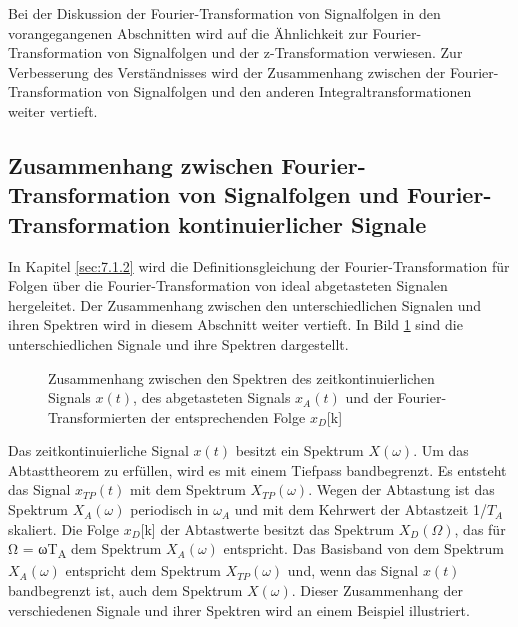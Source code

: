 Bei der Diskussion der Fourier-Transformation von Signalfolgen in den vorangegangenen Abschnitten wird auf die Ähnlichkeit zur Fourier-Transformation von Signalfolgen und der z-Transformation verwiesen. Zur Verbesserung des Verständnisses wird der Zusammenhang zwischen der Fourier-Transformation von Signalfolgen und den anderen Integraltransformationen weiter vertieft.

\subsection{Zusammenhang zwischen Fourier-Transformation von Signalfolgen und Fourier-Transformation kontinuierlicher Signale}\label{sec:zusammenhang-zwischen-fourier-transformation-von-signalfolgen-und-fourier-transformation-kontinuierlicher-signale}

In Kapitel \ref{sec:7.1.2} wird die Definitionsgleichung der Fourier-Transformation für Folgen über die Fourier-Transformation von ideal abgetasteten Signalen hergeleitet. Der Zusammenhang zwischen den unterschiedlichen Signalen und ihren Spektren wird in diesem Abschnitt weiter vertieft. In Bild \ref{fig:7.14} sind die unterschiedlichen Signale und ihre Spektren dargestellt.

\begin{figure}
  \centering
  
  \caption{Zusammenhang zwischen den Spektren des zeitkontinuierlichen Signals \(x(t)\), des abgetasteten Signals \(x_{A}(t)\) und der Fourier-Transformierten der entsprechenden Folge \(x_{D}\){[}k{]}}
  \label{fig:7.14}
\end{figure}

Das zeitkontinuierliche Signal \(x(t)\) besitzt ein Spektrum \(X(ω)\). Um das Abtasttheorem zu erfüllen, wird es mit einem Tiefpass bandbegrenzt. Es entsteht das Signal \(x_{TP}(t)\) mit dem Spektrum \(X_{TP}(ω)\). Wegen der Abtastung ist das Spektrum \(X_{A}(ω)\) periodisch in \(ω_{A}\) und mit dem Kehrwert der Abtastzeit 1/\(T_{A}\) skaliert. Die Folge \(x_{D}\){[}k{]} der Abtastwerte besitzt das Spektrum \(X_{D}(Ω)\), das für Ω = ωT\textsubscript{A} dem Spektrum \(X_{A}(ω)\) entspricht. Das Basisband von dem Spektrum \(X_{A}(ω)\) entspricht dem Spektrum \(X_{TP}(ω)\) und, wenn das Signal \(x(t)\) bandbegrenzt ist, auch dem Spektrum \(X(ω)\). Dieser Zusammenhang der verschiedenen Signale und ihrer Spektren wird an einem Beispiel illustriert.

